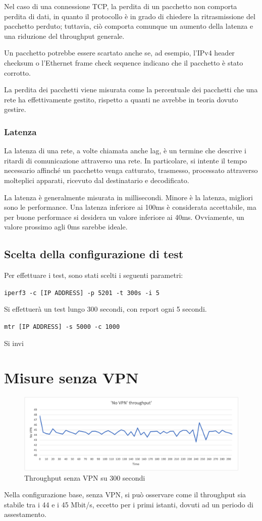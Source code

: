 Nel caso di una connessione TCP, la perdita di un pacchetto non comporta perdita di dati, in quanto il protocollo è in grado di chiedere la ritrasmissione del pacchetto perduto; tuttavia, ciò comporta comunque un aumento della latenza e una riduzione del throughput generale.

Un pacchetto potrebbe essere scartato anche se, ad esempio, l'IPv4 header checksum o l'Ethernet frame check sequence indicano che il pacchetto è stato corrotto.

La perdita dei pacchetti viene misurata come la percentuale dei pacchetti che una rete ha effettivamente gestito, rispetto a quanti ne avrebbe in teoria dovuto gestire.


\subsubsection{Latenza}
La latenza di una rete, a volte chiamata anche lag, è un termine che descrive i ritardi di comunicazione attraverso una rete. In particolare, si intente il tempo necessario affinché un pacchetto venga catturato, trasmesso, processato attraverso molteplici apparati, ricevuto dal destinatario e decodificato.

La latenza è generalmente misurata in millisecondi. Minore è la latenza, migliori sono le performance. Una latenza inferiore ai 100ms è considerata accettabile, ma per buone performace si desidera un valore inferiore ai 40ms. Ovviamente, un valore prossimo agli 0ms sarebbe ideale.

\subsection{Scelta della configurazione di test}
Per effettuare i test, sono stati scelti i seguenti parametri:


\texttt{iperf3 -c [IP ADDRESS] -p 5201 -t 300s -i 5}


Si effettuerà un test lungo 300 secondi, con report ogni 5 secondi.

\texttt{mtr [IP ADDRESS] -s 5000 -c 1000}


Si invi

\section{Misure senza VPN}
\begin{figure}[ht]
    \centering
    \includegraphics[width=12cm]{figure/vpn_thr.png-1.png}
    \caption{Throughput senza VPN su 300 secondi}
\end{figure}
Nella configurazione base, senza VPN, si può osservare come il throughput sia stabile tra i 44 e i 45 Mbit/s, eccetto per i primi istanti, dovuti ad un periodo di assestamento.

